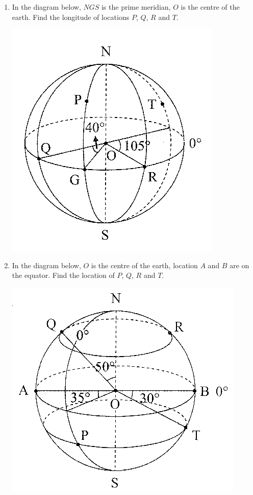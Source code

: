 \documentclass{report}
\begin{document}
\begin{multicols}{2}
    \begin{enumerate}
        \item In the diagram below, $NGS$ is the prime meridian, $O$ is the centre of the
              earth. Find the longitude of locations $P$, $Q$, $R$ and $T$.
              \begin{center}
                  \includegraphics[scale=1.3]{p3q1.png}
              \end{center}
        \item In the diagram below, $O$ is the centre of the earth, location $A$ and $B$ are
              on the equator. Find the location of $P$, $Q$, $R$ and $T$.
              \begin{center}
                  \includegraphics[scale=1.3]{p3q2.png}
              \end{center}
    \end{enumerate}


\end{multicols}
\end{document}
